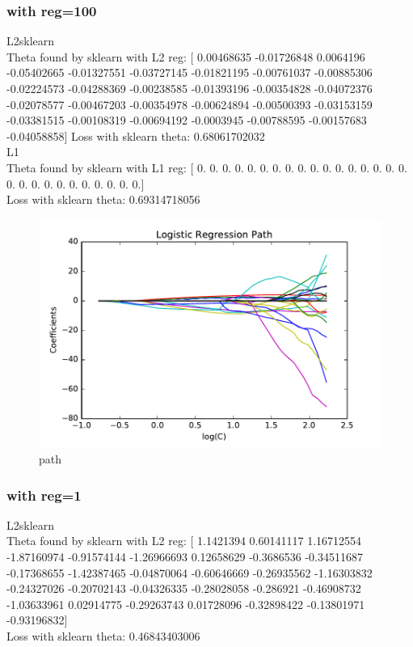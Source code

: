 \documentclass[pdftex,11pt]{article}
\begin{document}
\subsubsection{with reg=100}
L2sklearn\\
Theta found by sklearn with L2 reg:  [ 0.00468635 -0.01726848  0.0064196  -0.05402665 -0.01327551 -0.03727145
 -0.01821195 -0.00761037 -0.00885306 -0.02224573 -0.04288369 -0.00238585
 -0.01393196 -0.00354828 -0.04072376 -0.02078577 -0.00467203 -0.00354978
 -0.00624894 -0.00500393 -0.03153159 -0.03381515 -0.00108319 -0.00694192
 -0.0003945  -0.00788595 -0.00157683 -0.04058858]
Loss with sklearn theta:  0.68061702032\\
L1\\
Theta found by sklearn with L1 reg:  [ 0.  0.  0.  0.  0.  0.  0.  0.  0.  0.  0.  0.  0.  0.  0.  0.  0.  0.
  0.  0.  0.  0.  0.  0.  0.  0.  0.  0.]\\
Loss with sklearn theta:  0.69314718056
\begin{figure}[H]
  \caption{path}
  \centering
    \includegraphics[scale=0.5]{fig5reg100.pdf}
\end{figure}


\subsubsection{with reg=1}
L2sklearn\\
Theta found by sklearn with L2 reg:  [ 1.1421394   0.60141117  1.16712554 -1.87160974 -0.91574144 -1.26966693
  0.12658629 -0.3686536  -0.34511687 -0.17368655 -1.42387465 -0.04870064
 -0.60646669 -0.26935562 -1.16303832 -0.24327026 -0.20702143 -0.04326335
 -0.28028058 -0.286921   -0.46908732 -1.03633961  0.02914775 -0.29263743
  0.01728096 -0.32898422 -0.13801971 -0.93196832]\\
Loss with sklearn theta:  0.46843403006\\
\end{document}
